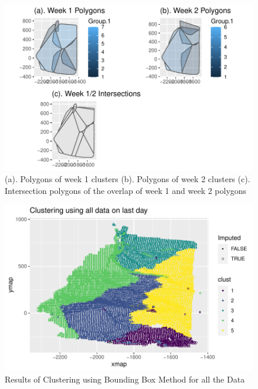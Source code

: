 \documentclass[12pt]{article}
\begin{document}
\begin{figure}[tbp]

{\centering \includegraphics[width=\linewidth,]{spatio-temporal-model-arctic-sea-ice_files/figure-latex/int-picture-1} 

}

\caption[Example of finding intersections]{(a). Polygons of week 1 clusters (b). Polygons of week 2 clusters (c). Intersection polygons of the overlap of week 1 and week 2 polygons}\label{fig:int-picture}
\end{figure}

\begin{figure}[tbp]

{\centering \includegraphics[width=\linewidth,]{spatio-temporal-model-arctic-sea-ice_files/figure-latex/ex-result-1} 

}

\caption{Results of Clustering using Bounding Box Method for all the Data}\label{fig:ex-result}
\end{figure}
\end{document}
